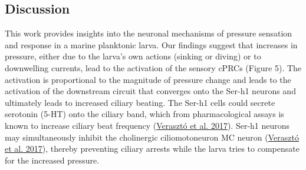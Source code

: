 \documentclass[
]{article}
\begin{document}
\hypertarget{discussion}{%
\subsection{Discussion}\label{discussion}}

This work provides insights into the neuronal mechanisms of pressure
sensation and response in a marine planktonic larva. Our findings
suggest that increases in pressure, either due to the larva's own
actions (sinking or diving) or to downwelling currents, lead to the
activation of the sensory cPRCs (Figure 5). The activation is
proportional to the magnitude of pressure change and leads to the
activation of the downstream circuit that converges onto the Ser-h1
neurons and ultimately leads to increased ciliary beating. The Ser-h1
cells could secrete serotonin (5-HT) onto the ciliary band, which from
pharmacological assays is known to increase ciliary beat frequency
(\protect\hyperlink{ref-veraszto2017a}{Verasztó et al. 2017}). Ser-h1
neurons may simultaneously inhibit the cholinergic ciliomotoneuron MC
neuron (\protect\hyperlink{ref-veraszto2017a}{Verasztó et al. 2017}),
thereby preventing ciliary arrests while the larva tries to compensate
for the increased pressure.
\end{document}
